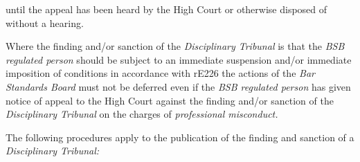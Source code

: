 until the appeal has been heard by the High Court or otherwise disposed
of without a hearing.\\
\par
Where the finding and/or sanction of the \emph{Disciplinary Tribunal }is
that the \emph{BSB regulated person }should be subject to an immediate
suspension and/or immediate imposition of conditions in accordance with
rE226\textbf{ }the actions of the \emph{Bar Standards Board }must not be
deferred even if the \emph{BSB regulated person }has given notice of
appeal to the High Court against the finding and/or sanction of
the \emph{Disciplinary Tribunal }on the charges of \emph{professional
misconduct.}\par
{}\par
{}
The following procedures apply to the publication of the finding and
sanction of a \emph{Disciplinary Tribunal:}\par

